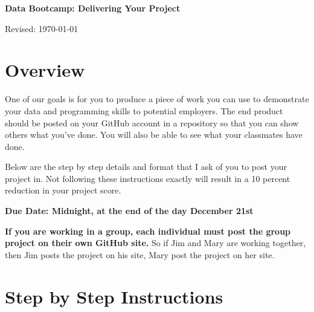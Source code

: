 


\pagestyle{headandfoot}
\runningheadrule
\firstpageheadrule
{}
\runningfooter{}{}{}



\bigskip\bigskip
\centerline{\Large \bf Data Bootcamp:  Delivering Your Project}
\centerline{Revised: \today}

\section*{Overview}

One of our goals is for you to produce a piece of work you can use to demonstrate your data and programming skills to potential employers. The end product should be posted on your GitHub account in a repository so that
you can show others what you've done. You will also be able to see what your classmates have done.

Below are the step by step details and format that I ask of you to post your project in. Not following these instructions exactly will result in a 10 percent reduction in your project score.

\textbf{Due Date: Midnight, at the end of the day December 21st}

\textbf{If you are working in a group, each individual must post the group project on their own GitHub site.} So if Jim and Mary are working together, then Jim posts the project on his site, Mary post the project on her site.

\section*{Step by Step Instructions}

